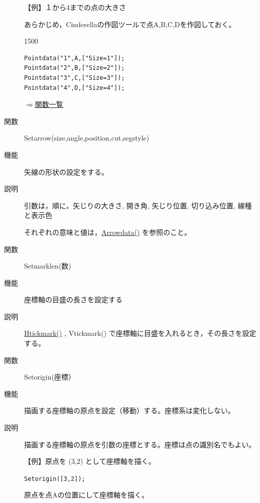 \documentclass[papersize,a4paper,12pt,uplatex]{jsarticle}
\begin{document}
\begin{description}
\vspace{\baselineskip}
【例】１から4までの点の大きさ

あらかじめ，Cinderellaの作図ツールで点A,B,C,Dを作図しておく。

\begin{layer}{150}{0}
\end{layer}

\begin{verbatim}
Pointdata("1",A,["Size=1"]);
Pointdata("2",B,["Size=2"]);
Pointdata("3",C,["Size=3"]);
Pointdata("4",D,["Size=4"]);
\end{verbatim}


\begin{flushright}\hyperlink{functionlist}{$\Rightarrow$関数一覧}\end{flushright}

\hypertarget{setarrow}{}
\item[関数]Setarrow(size,angle,position,cut,segstyle)
\item[機能]矢線の形状の設定をする。
\item[説明]引数は，順に，矢じりの大きさ, 開き角, 矢じり位置, 切り込み位置, 線種と表示色 

それぞれの意味と値は，\hyperlink{arrowdata}{Arrowdata()} を参照のこと。

\vspace{\baselineskip}
\hypertarget{setmarklen}{}
\item[関数]Setmarklen(数)
\item[機能]座標軸の目盛の長さを設定する
\item[説明] \hyperlink{htickmark}{Htickmark()} , Vtickmark() で座標軸に目盛を入れるとき，その長さを設定する。 

\vspace{\baselineskip}
\hypertarget{setorigin}{}
\item[関数]Setorigin(座標）
\item[機能]描画する座標軸の原点を設定（移動）する。座標系は変化しない。
\item[説明]描画する座標軸の原点を引数の座標とする。座標は点の識別名でもよい。

\vspace{\baselineskip}
【例】原点を (3,2) として座標軸を描く。

\hspace{10mm}\verb|Setorigin([3,2]);|

原点を点Aの位置にして座標軸を描く。


\end{description}
\end{document}
